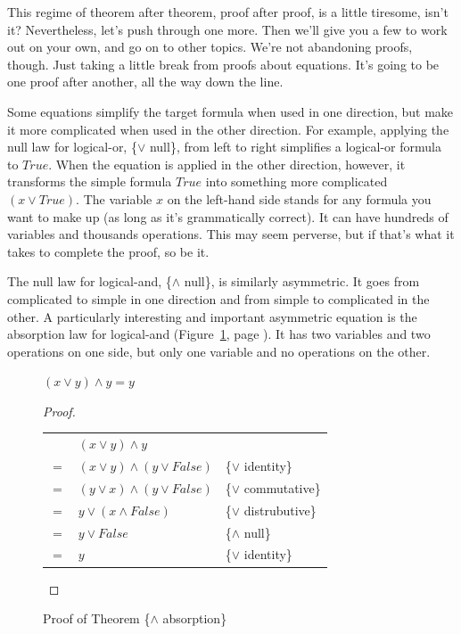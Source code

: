 This regime of theorem after theorem, proof after proof, is a little tiresome, isn't it?
Nevertheless, let's push through one more.
Then we'll give you a few to work out on your own, and go on to other topics.
We're not abandoning proofs, though.
Just taking a little break from proofs about equations.
It's going to be one proof after another, all the way down the line.

Some equations simplify the target formula when used in one direction,
but make it more complicated when used in the other direction.
For example, applying
the null law for logical-or, \{$\vee$ null\}, from left to right simplifies a logical-or formula to $True$.
When the equation is applied in the other direction, however,
it transforms the simple formula $True$ into something more complicated $(x \vee True)$.
The variable $x$ on the left-hand side
stands for any formula you want to make up (as long as it's grammatically correct).
It can have hundreds of variables and thousands operations.
This may seem perverse, but if that's what it takes to complete the proof, so be it.

The null law for logical-and, \{$\wedge$ null\}, is similarly asymmetric.
It goes from complicated to simple in one direction
and from simple to complicated in the other.
A particularly interesting and important asymmetric equation
is the absorption law for logical-and
(Figure~\ref{and-absorption-thm}, page \pageref{and-absorption-thm}).
It has two variables and two operations on one side, but only one variable and no operations on the other.

\begin{figure}
\begin{theorem}
$(x \vee y) \wedge y = y$
\end{theorem}

\begin{proof}
\mbox{} \\
\begin{tabular}{llp{3.15in}}
    & $(x \vee y) \wedge y$                & \\
$=$ & $(x \vee y) \wedge (y \vee False)$   & \{$\vee$ identity\} \\
$=$ & $(y \vee x) \wedge (y \vee False)$   & \{$\vee$ commutative\} \\
$=$ & $y \vee (x \wedge False)$            & \{$\vee$ distrubutive\} \\
$=$ & $y \vee False$                       & \{$\wedge$ null\} \\
$=$ & $y$                                  & \{$\vee$ identity\} \\
\end{tabular}

\end{proof}
\caption{Proof of Theorem \{$\wedge$ absorption\}}
\label{and-absorption-thm}
\end{figure}

